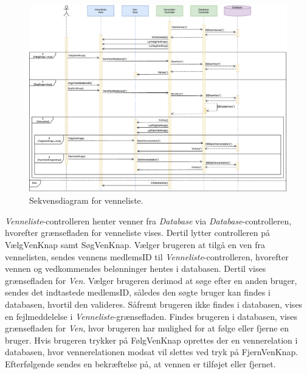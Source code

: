 \begin{figure} [H]
\centering
\includegraphics[width=1.55\textwidth, angle=90]{figures/Sek/SEKVenneliste}
\caption{Sekvensdiagram for venneliste.}
\label{fig:SEKVenneliste}
\end{figure}

\noindent
\textit{Venneliste}-controlleren henter venner fra \textit{Database} via \textit{Database}-controlleren, hvorefter grænsefladen for venneliste vises. 
Dertil lytter controlleren på VælgVenKnap samt SøgVenKnap. Vælger brugeren at tilgå en ven fra vennelisten, sendes vennens medlemsID til \textit{Venneliste}-controlleren, hvorefter vennen og vedkommendes belønninger hentes i databasen. Dertil vises grænsefladen for \textit{Ven}. Vælger brugeren derimod at søge efter en anden bruger, sendes det indtastede medlemsID, således den søgte bruger kan findes i databasen, hvortil den valideres. Såfremt brugeren ikke findes i databasen, vises en fejlmeddelelse i \textit{Venneliste}-grænsefladen. Findes brugeren i databasen, vises grænsefladen for \textit{Ven}, hvor brugeren har mulighed for at følge eller fjerne en bruger. Hvis brugeren trykker på FølgVenKnap oprettes der en vennerelation i databasen, hvor vennerelationen modsat vil slettes ved tryk på FjernVenKnap. Efterfølgende sendes en bekræftelse på, at vennen er tilføjet eller fjernet. 




